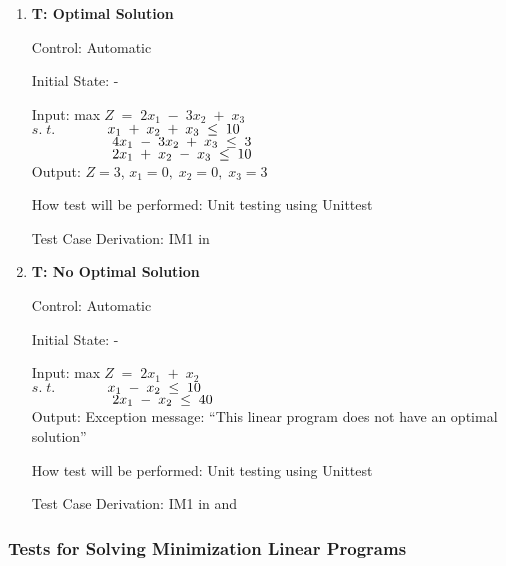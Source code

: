 \documentclass[12pt, titlepage]{article}
\newcounter{testnum} %
\begin{document}
\begin{enumerate}
	\item{\textbf{T\thetestnum \label{Max_Opt}: Optimal 
	Solution}}
	
	Control: Automatic 
	
	Initial State: -
	
	Input: max$\;Z\;=\;2x_1\;-\;3x_2\;+\;x_3$\\
	$s.\;t.$$\hspace*{1.3cm} x_1\;+\;x_2\;+\;x_3\; \leq \;10$\\
	$\hspace*{2cm} 4x_1\;-\;3x_2\;+\;x_3\; \leq \;3$\\
	$\hspace*{2cm} 2x_1\;+\;x_2\;-\;x_3\; \leq \;10$\\
	
	Output: $Z = 3$, $x_1=0,\;x_2=0,\;x_3=3$
	
	How test will be performed: Unit testing using Unittest
	
	Test Case Derivation: IM1 in \cite{losms-ca} 

	\item{\textbf{T\thetestnum \label{Max_NoOpt}: No 
	Optimal Solution}}
	
	Control: Automatic 
	
	Initial State: -
	
	Input: max$\;Z\;=\;2x_1\;+\;x_2$\\
	$s.\;t.$$\hspace*{1.3cm} x_1\;-\;x_2\; \leq \;10$\\
	$\hspace*{2cm} 2x_1\;-\;x_2\; \leq \;40$\\
	
	Output: Exception message: ``This linear program does not have an optimal 
	solution''
	
	How test will be performed: Unit testing using Unittest
	
	Test Case Derivation: IM1 in \cite{losms-ca} and 
	\cite{simplex-special-situations}
\end{enumerate}

\subsubsection{Tests for Solving Minimization Linear Programs}
\end{document}
